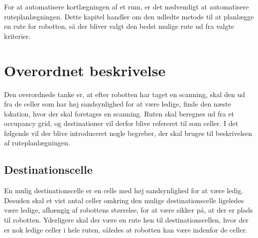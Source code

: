 \label{ruteplanleagning}
\newcommand{\unkcell}[3][]{\node (robot) [draw,fill=yellow, text centered, rectangle,
minimum height=\cellsize cm,minimum width=\cellsize cm, align=right] at ($(#2*\cellsize,#3*\cellsize) + (\cellsize/2,\cellsize/2)$) {$\scriptstyle #1$};}

\newcommand{\emptycell}[3][]{\node (robot) [draw,fill=green, text centered, rectangle,
minimum height=\cellsize cm,minimum width=\cellsize cm, align=right] at ($(#2*\cellsize,#3*\cellsize) + (\cellsize/2,\cellsize/2)$) {$\scriptstyle #1$};}

\newcommand{\occcell}[3][]{\node (robot) [draw,fill=red, text centered, rectangle,
minimum height=\cellsize cm,minimum width=\cellsize cm, align=right] at ($(#2*\cellsize,#3*\cellsize) + (\cellsize/2,\cellsize/2)$) {$\scriptstyle #1$};}

\newcommand{\scancell}[3][]{\node (robot) [draw,fill=orange, text centered, rectangle,
minimum height=\cellsize cm,minimum width=\cellsize cm, align=right] at ($(#2*\cellsize,#3*\cellsize) + (\cellsize/2,\cellsize/2)$) {$\scriptstyle #1$};}

\newcommand{\destcell}[3][]{\node (robot) [draw,fill=blue, text centered, rectangle,
minimum height=\cellsize cm,minimum width=\cellsize cm, align=right] at ($(#2*\cellsize,#3*\cellsize) + (\cellsize/2,\cellsize/2)$) {$\scriptstyle #1$};}

For at automatisere kortlægningen af et rum, er det nødvendigt at automatisere ruteplanlægningen.
Dette kapitel handler om den udledte metode til at planlægge en rute for robotten, så der bliver valgt den bedst mulige rute ud fra valgte kriterier.

\section{Overordnet beskrivelse}
Den overordnede tanke er, at efter robotten har taget en scanning, skal den ud fra de celler som har høj sandsynlighed for at være ledige, finde den næste lokation, hvor der skal foretages en scanning.
Ruten skal beregnes ud fra et occupancy grid, og destinationer vil derfor blive refereret til som celler.
I det følgende vil der blive introduceret nogle begreber, der skal bruges til beskrivelsen af ruteplanlægningen.

\subsection{Destinationscelle}\label{rute:destinationscelle}
En mulig destinationscelle er en celle med høj sandsynlighed for at være ledig.
Desuden skal et vist antal celler omkring den mulige destinationscelle ligeledes være ledige, afhængig af robottens størrelse, for at være sikker på, at der er plads til robotten.
Yderligere skal der være en rute hen til destinationscellen, hvor der er nok ledige celler i hele ruten, således at robotten kan være indenfor de celler.

